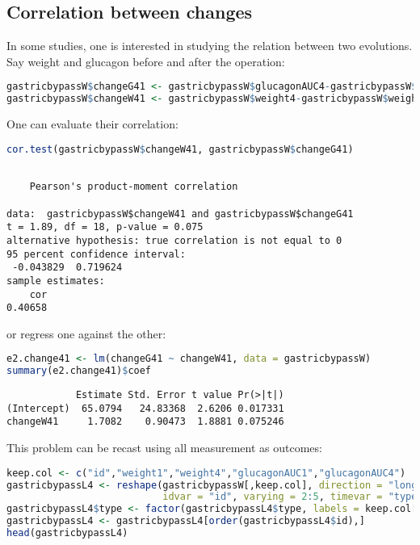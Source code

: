 \documentclass[12pt]{article}
\begin{document}
\subsection{Correlation between changes}
\label{sec:org0ba4a31}

In some studies, one is interested in studying the relation between
two evolutions. Say weight and glucagon before and after the
operation:
\begin{lstlisting}[language=r,numbers=none]
gastricbypassW$changeG41 <- gastricbypassW$glucagonAUC4-gastricbypassW$glucagonAUC1
gastricbypassW$changeW41 <- gastricbypassW$weight4-gastricbypassW$weight1
\end{lstlisting}

\bigskip

One can evaluate their correlation:
\begin{lstlisting}[language=r,numbers=none]
cor.test(gastricbypassW$changeW41, gastricbypassW$changeG41)
\end{lstlisting}

\label{}
\begin{verbatim}

	Pearson's product-moment correlation

data:  gastricbypassW$changeW41 and gastricbypassW$changeG41
t = 1.89, df = 18, p-value = 0.075
alternative hypothesis: true correlation is not equal to 0
95 percent confidence interval:
 -0.043829  0.719624
sample estimates:
    cor 
0.40658
\end{verbatim}

or regress one against the other:
\begin{lstlisting}[language=r,numbers=none]
e2.change41 <- lm(changeG41 ~ changeW41, data = gastricbypassW)
summary(e2.change41)$coef
\end{lstlisting}

\label{}
\begin{verbatim}
            Estimate Std. Error t value Pr(>|t|)
(Intercept)  65.0794   24.83368  2.6206 0.017331
changeW41     1.7082    0.90473  1.8881 0.075246
\end{verbatim}


This problem can be recast using all measurement as outcomes:
\begin{lstlisting}[language=r,numbers=none]
keep.col <- c("id","weight1","weight4","glucagonAUC1","glucagonAUC4")
gastricbypassL4 <- reshape(gastricbypassW[,keep.col], direction = "long",
                           idvar = "id", varying = 2:5, timevar = "type", v.names = "value")
gastricbypassL4$type <- factor(gastricbypassL4$type, labels = keep.col[-1])
gastricbypassL4 <- gastricbypassL4[order(gastricbypassL4$id),]
head(gastricbypassL4)
\end{lstlisting}
\end{document}
